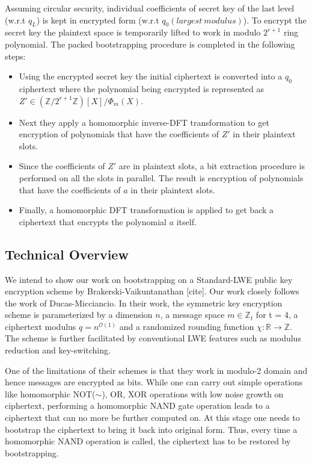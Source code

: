\documentclass[10pt,journal,compsoc]{IEEEtran}
\theoremstyle{definition}
\begin{document}
Assuming circular security, individual coefficients of secret key of the last level (w.r.t $q_L$) is kept in encrypted form (w.r.t $q_0 \left(largest\ modulus\right)$). To encrypt the secret key the plaintext space is temporarily lifted to work in modulo $2^{r+1}$ ring polynomial. The packed bootstrapping procedure is completed in the following steps:

\begin{itemize}
\item Using the encrypted secret key the initial ciphertext is converted into a $q_0$ ciphertext where the polynomial being encrypted is represented as $Z' \in \left( \mathbb{Z}/2^{r+1}\mathbb{Z}\right)\left[X\right]/\Phi_m\left(X\right)$.

\item Next they apply a homomorphic inverse-DFT transformation to get encryption of polynomials that have the coefficients of $Z'$ in their plaintext slots.

\item Since the coefficients of $Z'$ are in plaintext slots, a bit extraction procedure is performed
on all the slots in parallel. The result is encryption of polynomials that have the coefficients of $a$ in their plaintext slots.

\item Finally, a homomorphic DFT transformation is applied to get back a ciphertext that encrypts the polynomial $a$ itself.
\end{itemize} 

\subsection{Technical Overview}

We intend to show our work on bootstrapping on a Standard-LWE public key encryption scheme by Brakerski-Vaikuntanathan [cite]. Our work closely follows the work of Ducas-Micciancio. In their work, the symmetric key encryption scheme is parameterized by a dimension $n$, a message space $m \in \mathbb{Z}_t$ for t = 4, a ciphertext modulus  $q = n^{\mathcal{O}(1)}$ and a randomized rounding function $\chi \colon \mathbb{R} \rightarrow \mathbb{Z}$. The scheme is further facilitated by conventional LWE features such as modulus reduction and key-switching. 

One of the limitations of their schemes is that they work in modulo-2 domain and hence messages are encrypted as bits. While one can carry out simple operations like homomorphic NOT($\sim$), OR, XOR operations with low noise growth on ciphertext, performing a homomorphic NAND gate operation leads to a ciphertext that can no more be further computed on. At this stage one needs to bootstrap the ciphertext to bring it back into original form. Thus, every time a homomorphic NAND operation is called, the ciphertext has to be restored by bootstrapping. 
\end{document}
